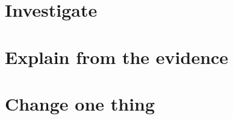 


\telosmasthead[\editiontag\ --- \docstrap]
\rolecard
\begin{materials}\materialslist\end{materials}
\begin{predict}\prediction\end{predict}
\diagram
\section{Investigate}
\procedure
\section{Explain from the evidence}
\explanation
\section{Change one thing}
\extension
\begin{recordbox}\end{recordbox}
\sourcefoot

